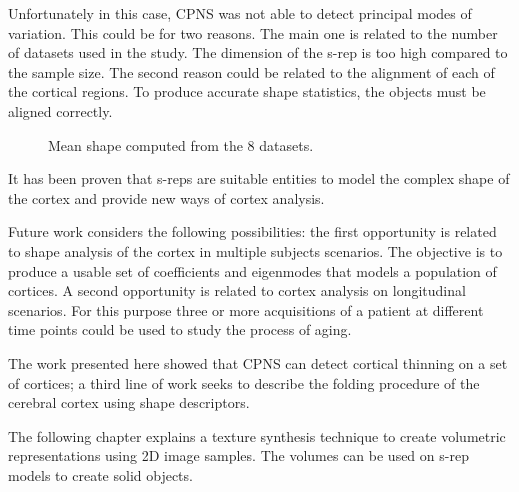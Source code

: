 \documentclass[a4paper,twoside]{article}
\begin{document}
Unfortunately in this case, CPNS was not able to detect principal modes of variation.
This could be for two reasons. The main one is related to the number of datasets 
used in the study. The dimension of the s-rep 
is too high compared to the sample size.
The second reason could be related to the alignment 
of each of the cortical regions. 
To produce accurate shape statistics, the objects must be aligned correctly.


\begin{figure}  
  \centering
  \caption[Mean shape of the cortex: CPNS and \textit{Freesurfer}.]{Mean shape computed from the 8 datasets.}
  \label{fig:CPNSMean}   
\end{figure}

It has been proven that s-reps are suitable 
entities to model the complex shape of the cortex and provide new ways of cortex analysis. 

Future work considers the following possibilities:
the first opportunity is related to shape analysis of the cortex in 
multiple subjects scenarios. The objective is to produce a usable set of coefficients
and eigenmodes that models a population of cortices.
A second opportunity is related to cortex analysis on longitudinal scenarios. 
For this purpose three or more acquisitions of a patient at different time points could be used 
to study the process of aging. 

The work presented here showed that CPNS can detect cortical thinning on a set of cortices; 
a third line of work seeks to describe the folding procedure of the cerebral cortex
using shape descriptors.

The following chapter explains a texture synthesis technique to create volumetric representations using 
2D image samples. The volumes can be used on s-rep models to create 
solid objects.


\vfill

{\small
}

\vfill
\end{document}
